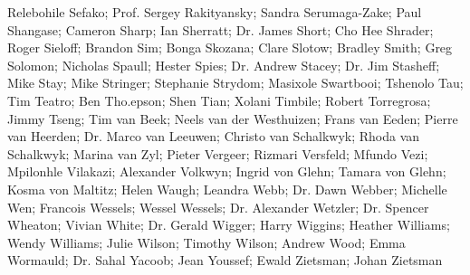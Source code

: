    Relebohile Sefako;
    Prof. Sergey Rakityansky;
    Sandra Serumaga-Zake;
    Paul Shangase;
    Cameron Sharp;
    Ian Sherratt;
Dr. James Short;
    Cho Hee Shrader;
    Roger Sieloff;
    Brandon Sim;
    Bonga Skozana;
    Clare Slotow;
    Bradley Smith;
    Greg Solomon;
    Nicholas Spaull;
    Hester Spies;
Dr. Andrew Stacey;
Dr. Jim Stasheff;
    Mike Stay;
    Mike Stringer;
    Stephanie Strydom;
    Masixole Swartbooi;
    Tshenolo Tau;
    Tim Teatro;
    Ben Tho.epson;
    Shen Tian;
    Xolani Timbile;
    Robert Torregrosa;
    Jimmy Tseng;
    Tim van Beek;
    Neels van der Westhuizen;
    Frans van Eeden;
    Pierre van Heerden;
Dr. Marco van Leeuwen;
    Christo van Schalkwyk;
    Rhoda van Schalkwyk;
    Marina van Zyl;
    Pieter Vergeer;
    Rizmari Versfeld;
    Mfundo Vezi;
    Mpilonhle Vilakazi;
    Alexander Volkwyn;
    Ingrid von Glehn;
    Tamara von Glehn;
    Kosma von Maltitz;
    Helen Waugh;
    Leandra Webb;
Dr. Dawn Webber;
    Michelle Wen;
    Francois Wessels;
    Wessel Wessels;
Dr. Alexander Wetzler;
Dr. Spencer Wheaton;
    Vivian White;
Dr. Gerald Wigger;
    Harry Wiggins;
    Heather Williams;
    Wendy Williams;
    Julie Wilson;
    Timothy Wilson;
    Andrew Wood;
    Emma Wormauld;
Dr. Sahal Yacoob;
    Jean Youssef;
    Ewald Zietsman;
    Johan Zietsman





\normalfont
